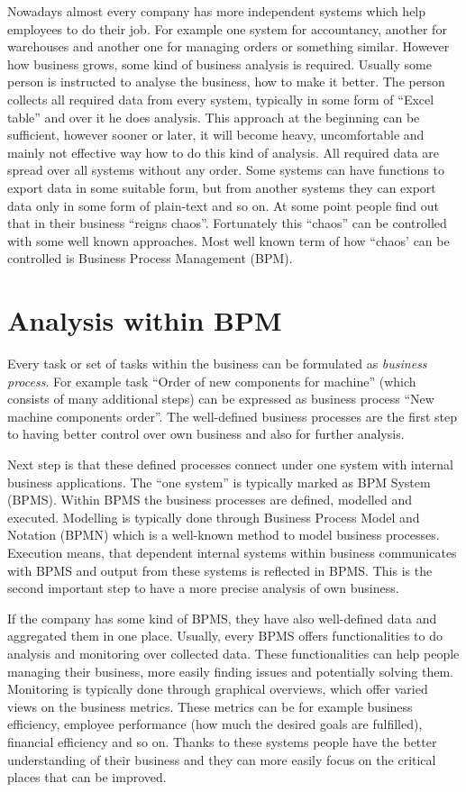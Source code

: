Nowadays almost every company has more independent systems which help employees to do their job. For example one system for accountancy, another for warehouses and another one for managing orders or something similar. However how business grows, some kind of business analysis is required. Usually some person is instructed to analyse the business, how to make it better. The person collects all required data from every system, typically in some form of  ``Excel table'' and over it he does analysis. This approach at the beginning can be sufficient, however sooner or later, it will become heavy, uncomfortable and mainly not effective way how to do this kind of analysis. All required data are spread over all systems without any order. Some systems can have functions to export data in some suitable form, but from another systems they can export data only in some form of plain-text and so on.  At some point people find out that in their business ``reigns chaos''. Fortunately this ``chaos'' can be controlled with some well known approaches. Most well known term of how ``chaos' can be controlled is Business Process Management (BPM).

\section{Analysis within BPM}
Every task or set of tasks within the business can be formulated as \textit{business process}. For example task ``Order of new components for machine'' (which consists of many additional steps)  can be expressed as business process ``New machine components order''. The well-defined business processes are the first step to having better control over own business and also for further analysis. 

Next step is that these defined processes connect under one system with internal business applications. The ``one system'' is typically marked as BPM System (BPMS). Within BPMS the business processes are defined, modelled and executed. Modelling is typically done through Business Process Model and Notation (BPMN) which is a well-known method to model business processes. Execution means, that dependent internal systems within business communicates with BPMS and output from these systems is reflected in BPMS. This is the second important step to have a more precise analysis of own business.

If the company has some kind of BPMS, they have also well-defined data and aggregated them in one place. Usually, every BPMS offers functionalities to do analysis and monitoring over collected data. These functionalities can help people managing their business, more easily finding issues and potentially solving them. Monitoring is typically done through graphical overviews, which offer varied views on the business metrics. These metrics can be for example business efficiency, employee performance (how much the desired goals are fulfilled), financial efficiency and so on. Thanks to these systems people have the better understanding of their business and they can more easily focus on the critical places that can be improved.

